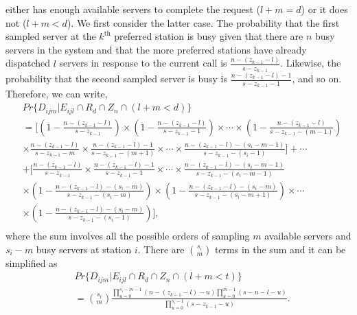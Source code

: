 \documentclass[11pt]{article}\topmargin 0mm
\begin{document}
either has enough available servers to complete the request
($l+m=d$) or it does not ($l+m<d$). We first consider the
latter case. The probability that the first sampled server at
the $k^\text{th}$ preferred station is busy given that there
are $n$ busy servers in the system and that the more preferred
stations have already dispatched $l$ servers in response to the
current call is $\frac{n-(z_{k-1}-l)}{s-z_{k-1}}$. {\color{blue}{This probability is computed under the assumption that servers are dependent. The denominator is the total number of servers at stations with preference $k,\cdots,|I|$ and the numerator is the number of busy servers at those stations.}} Likewise,
the probability that the second sampled server is busy is
$\frac{n-(z_{k-1}-l)-1}{s-z_{k-1}-1}$, and so on. Therefore, we
can write,
\begin{equation}
\begin{split}
& Pr\{D_{ijm}|E_{ijl} \cap R_d \cap Z_n \cap (l+m<d)\} \\
& = \Biggl[\left(1-\frac{n-(z_{k-1}-l)}{s-z_{k-1}}\right)\times \left(1-\frac{n-(z_{k-1}-l)}{s-z_{k-1}-1}\right)\times \cdots \times \left(1-\frac{n-(z_{k-1}-l)}{s-z_{k-1}-(m-1)}\right) \\
& \times \frac{n-(z_{k-1}-l)}{s-z_{k-1}-m} \times \frac{n-(z_{k-1}-l)-1}{s-z_{k-1}-(m+1)} \times \cdots \times \frac{n-(z_{k-1}-l)-(s_i-m-1)}{s-z_{k-1}-(s_i-1)}\Biggr] + \cdots \\
& + \Biggl[\frac{n-(z_{k-1}-l)}{s-z_{k-1}}\times \frac{n-(z_{k-1}-l)-1}{s-z_{k-1}-1}\times \cdots \times \frac{n-(z_{k-1}-l)-(s_i-m-1)}{s-z_{k-1}-(s_i-m-1)} \\
& \times \left(1-\frac{n-(z_{k-1}-l)-(s_i-m)}{s-z_{k-1}-(s_i-m)}\right) \times \left(1-\frac{n-(z_{k-1}-l)-(s_i-m)}{s-z_{k-1}-(s_i-m+1)}\right) \times \cdots \\
& \times \left(1-\frac{n-(z_{k-1}-l)-(s_i-m)}{s-z_{k-1}-(s_i-1)}\right)\Biggr], \\
\end{split}
\end{equation}
where the sum involves all the possible orders of sampling $m$
available servers and $s_i-m$ busy servers at station $i$.
There are ${s_i \choose m}$ terms in the sum and it can be
simplified as
\begin{equation}
\label{eq:P(Aijm|l+m<d)}
\begin{split}
& Pr\{D_{ijm}|E_{ijl} \cap R_d \cap Z_n \cap (l+m<t)\} \\
& = {s_i \choose m} \frac{\prod_{u=0}^{s_i-m-1}(n-(z_{k-1}-l)-u) \prod_{u=0}^{m-1}(s-n-l-u)}{\prod_{u=0}^{s_i-1}(s-z_{k-1}-u)}.
\end{split}
\end{equation}
\end{document}
